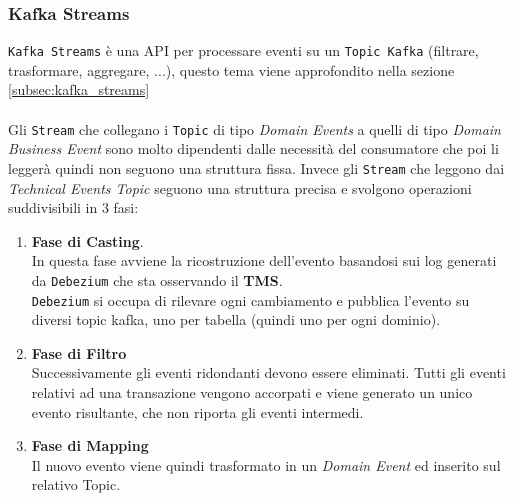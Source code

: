 \subsubsection{Kafka Streams}
\label{subsubsec:kafka_stream}
\texttt{Kafka Streams} è una API per processare eventi su un \texttt{Topic Kafka} (filtrare, trasformare, aggregare, ...), questo tema viene approfondito nella sezione \ref{subsec:kafka_streams}\\
\\
Gli \texttt{Stream} che collegano i \texttt{Topic} di tipo \textit{Domain Events} a quelli di tipo \textit{Domain Business Event} sono molto dipendenti dalle necessità del consumatore che poi li leggerà quindi non seguono una struttura fissa.
Invece gli \texttt{Stream} che leggono dai \textit{Technical Events Topic} seguono una struttura precisa e svolgono operazioni suddivisibili in 3 fasi:
\begin{enumerate}
    \item \textbf{Fase di Casting}.\\
    In questa fase avviene la ricostruzione dell'evento basandosi sui log generati da \texttt{Debezium} che sta osservando il \textbf{TMS}.\\
    \texttt{Debezium} si occupa di rilevare ogni cambiamento e pubblica l'evento su diversi topic kafka, uno per tabella (quindi uno per ogni dominio). 
    \item \textbf{Fase di Filtro}\\
    Successivamente gli eventi ridondanti devono essere eliminati. Tutti gli eventi relativi ad una transazione vengono accorpati e viene generato un unico evento risultante, che non riporta gli eventi intermedi. 
    \item \textbf{Fase di Mapping}\\
    Il nuovo evento viene quindi trasformato in un \textit{Domain Event} ed inserito sul relativo Topic.
\end{enumerate}

